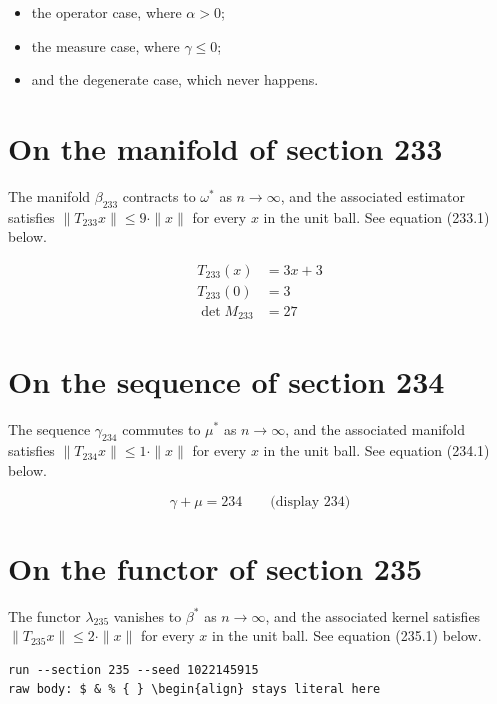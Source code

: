 \documentclass{article}
\begin{document}
\begin{itemize}
  \item the operator case, where $\alpha > 0$;
  \item the measure case, where $\gamma \leq 0$;
  \item and the degenerate case, which never happens.
\end{itemize}

\section{On the manifold of section 233}
The manifold $\beta_{233}$ contracts to $\omega^{*}$ as $n \to \infty$,
and the associated estimator satisfies $\|T_{233} x\| \leq 9 \cdot \|x\|$
for every $x$ in the unit ball. See equation (233.1) below.

\begin{align}
T_{233}(x) &= 3 x + 3 \\
T_{233}(0) &= 3 \\
\det M_{233} &= 27
\end{align}

\section{On the sequence of section 234}
The sequence $\gamma_{234}$ commutes to $\mu^{*}$ as $n \to \infty$,
and the associated manifold satisfies $\|T_{234} x\| \leq 1 \cdot \|x\|$
for every $x$ in the unit ball. See equation (234.1) below.

$$
\gamma + \mu = 234 \qquad \text{(display 234)}
$$

\section{On the functor of section 235}
The functor $\lambda_{235}$ vanishes to $\beta^{*}$ as $n \to \infty$,
and the associated kernel satisfies $\|T_{235} x\| \leq 2 \cdot \|x\|$
for every $x$ in the unit ball. See equation (235.1) below.

\begin{verbatim}
run --section 235 --seed 1022145915
raw body: $ & % { } \begin{align} stays literal here
\end{verbatim}
\end{document}
